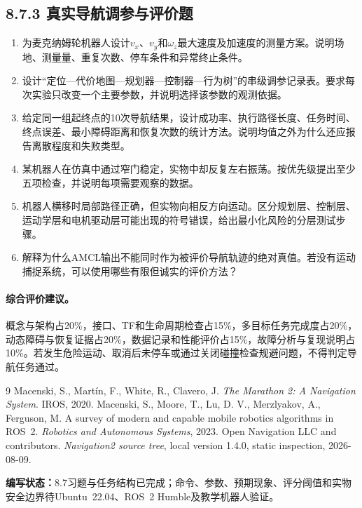 \documentclass[UTF8,zihao=-4]{ctexart}
\begin{document}
\subsection*{8.7.3 真实导航调参与评价题}

\begin{enumerate}[label=\arabic*.]
  \item 为麦克纳姆轮机器人设计$v_x$、$v_y$和$\omega_z$最大速度及加速度的测量方案。说明场地、测量量、重复次数、停车条件和异常终止条件。
  \item 设计“定位---代价地图---规划器---控制器---行为树”的串级调参记录表。要求每次实验只改变一个主要参数，并说明选择该参数的观测依据。
  \item 给定同一组起终点的10次导航结果，设计成功率、执行路径长度、任务时间、终点误差、最小障碍距离和恢复次数的统计方法。说明均值之外为什么还应报告离散程度和失败类型。
  \item 某机器人在仿真中通过窄门稳定，实物中却反复左右振荡。按优先级提出至少五项检查，并说明每项需要观察的数据。
  \item 机器人横移时局部路径正确，但实物向相反方向运动。区分规划层、控制层、运动学层和电机驱动层可能出现的符号错误，给出最小化风险的分层测试步骤。
  \item 解释为什么AMCL输出不能同时作为被评价导航轨迹的绝对真值。若没有运动捕捉系统，可以使用哪些有限但诚实的评价方法？
\end{enumerate}

\paragraph{综合评价建议。}
概念与架构占20\%，接口、TF和生命周期检查占15\%，多目标任务完成度占20\%，动态障碍与恢复证据占20\%，数据记录和性能评价占15\%，故障分析与复现说明占10\%。若发生危险运动、取消后未停车或通过关闭碰撞检查规避问题，不得判定导航任务通过。

\begin{thebibliography}{9}
 Macenski, S., Martín, F., White, R., Clavero, J. \emph{The Marathon 2: A Navigation System}. IROS, 2020.
 Macenski, S., Moore, T., Lu, D. V., Merzlyakov, A., Ferguson, M. A survey of modern and capable mobile robotics algorithms in ROS~2. \emph{Robotics and Autonomous Systems}, 2023.
 Open Navigation LLC and contributors. \emph{Navigation2 source tree}, local version 1.4.0, static inspection, 2026-08-09.
\end{thebibliography}

\noindent\textbf{编写状态：}8.7习题与任务结构已完成；命令、参数、预期现象、评分阈值和实物安全边界待Ubuntu~22.04、ROS~2 Humble及教学机器人验证。
\end{document}
